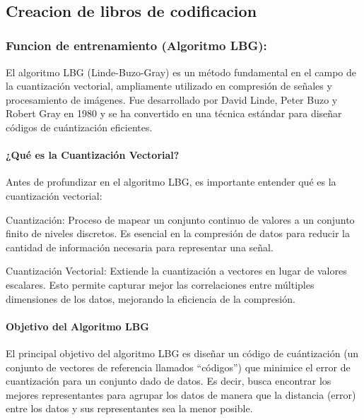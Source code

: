 \documentclass[11pt]{article}
\begin{document}
    \begin{center}
    \end{center}
    { \hspace*{\fill} \\}
    
    \subsection{Creacion de libros de
codificacion}\label{creacion-de-libros-de-codificacion}

\subsubsection{Funcion de entrenamiento (Algoritmo
LBG):}\label{funcion-de-entrenamiento-algoritmo-lbg}

El algoritmo LBG (Linde-Buzo-Gray) es un método fundamental en el campo
de la cuantización vectorial, ampliamente utilizado en compresión de
señales y procesamiento de imágenes. Fue desarrollado por David Linde,
Peter Buzo y Robert Gray en 1980 y se ha convertido en una técnica
estándar para diseñar códigos de cuántización eficientes.

\paragraph{¿Qué es la Cuantización
Vectorial?}\label{quuxe9-es-la-cuantizaciuxf3n-vectorial}

Antes de profundizar en el algoritmo LBG, es importante entender qué es
la cuantización vectorial:

Cuantización: Proceso de mapear un conjunto continuo de valores a un
conjunto finito de niveles discretos. Es esencial en la compresión de
datos para reducir la cantidad de información necesaria para representar
una señal.

Cuantización Vectorial: Extiende la cuantización a vectores en lugar de
valores escalares. Esto permite capturar mejor las correlaciones entre
múltiples dimensiones de los datos, mejorando la eficiencia de la
compresión.

\paragraph{Objetivo del Algoritmo LBG}\label{objetivo-del-algoritmo-lbg}

El principal objetivo del algoritmo LBG es diseñar un código de
cuántización (un conjunto de vectores de referencia llamados
``códigos'') que minimice el error de cuantización para un conjunto dado
de datos. Es decir, busca encontrar los mejores representantes para
agrupar los datos de manera que la distancia (error) entre los datos y
sus representantes sea la menor posible.
\end{document}
